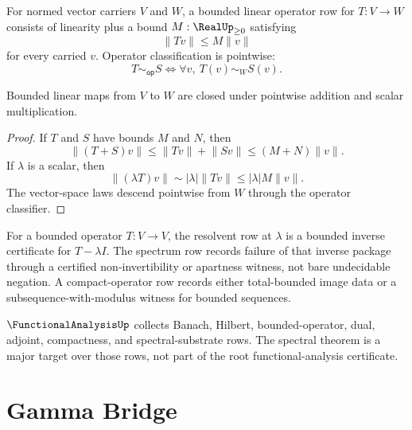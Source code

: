 \begin{definition}
\label{def:analysis-spine-bounded-linear-operator}
For normed vector carriers $V$ and $W$, a bounded linear operator row for
$T:V\to W$ consists of linearity plus a bound $M:\RealUp_{\ge0}$ satisfying
$$
\lVert T v\rVert\le M\lVert v\rVert
$$
for every carried $v$.  Operator classification is pointwise:
$$
T\sim_{\mathsf{op}}S
\Longleftrightarrow
\forall v,\ T(v)\sim_W S(v).
$$
\end{definition}

\begin{theorem}
\label{thm:analysis-spine-bounded-operators-vector-space}
Bounded linear maps from $V$ to $W$ are closed under pointwise addition and
scalar multiplication.
\end{theorem}

\begin{proof}
If $T$ and $S$ have bounds $M$ and $N$, then
$$
\lVert (T+S)v\rVert
\le
\lVert Tv\rVert+\lVert Sv\rVert
\le
(M+N)\lVert v\rVert .
$$
If $\lambda$ is a scalar, then
$$
\lVert(\lambda T)v\rVert
\sim
|\lambda|\lVert Tv\rVert
\le
|\lambda|M\lVert v\rVert .
$$
The vector-space laws descend pointwise from $W$ through the operator
classifier.
\end{proof}

\begin{definition}
\label{def:analysis-spine-spectrum-compact}
For a bounded operator $T:V\to V$, the resolvent row at $\lambda$ is a
bounded inverse certificate for $T-\lambda I$.  The spectrum row records
failure of that inverse package through a certified non-invertibility or
apartness witness, not bare undecidable negation.  A compact-operator row
records either total-bounded image data or a subsequence-with-modulus witness
for bounded sequences.
\end{definition}

\begin{principle}
\label{prin:analysis-spine-functional-analysis-boundary}
$\FunctionalAnalysisUp$ collects Banach, Hilbert, bounded-operator, dual,
adjoint, compactness, and spectral-substrate rows.  The spectral theorem is a
major target over those rows, not part of the root functional-analysis
certificate.
\end{principle}

\section{Gamma Bridge}
\label{sec:analysis-spine-gamma}

